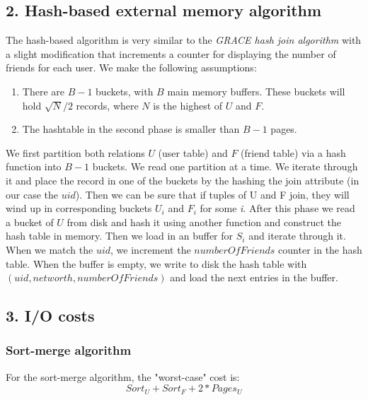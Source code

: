 \documentclass{article}      %
\begin{document}
\subsection* {2. Hash-based external memory algorithm}

The hash-based algorithm is very similar to the \emph{GRACE hash join algorithm} with a slight modification that increments a counter for displaying the number of friends for each user. We make the following assumptions:

\begin{enumerate}
\item 
There are $B-1$ buckets, with $B$ main memory buffers. These buckets will hold \begin{math}\sqrt{N}/2\end{math} records, where $N$ is the highest of $U$ and $F$. 
\item
The hashtable in the second phase is smaller than $B-1$ pages.
\end{enumerate}

We first partition both relations $U$ (user table) and $F$ (friend table) via a hash function into $B-1$ buckets. We read one partition at a time. We iterate through it and place the record in one of the buckets by the hashing the join attribute (in our case the $uid$). Then we can be sure that if tuples of U and F join, they will wind up in corresponding buckets $U_i$ and $F_i$ for some \emph{i}. After this phase we read a bucket of $U$ from disk and hash it using another function and construct the hash table in memory. Then we load in an buffer for $S_i$ and iterate through it. When we match the $uid$, we increment the $numberOfFriends$ counter in the hash table. When the buffer is empty, we write to disk the hash table with $(uid, networth, numberOfFriends)$ and load the next entries in the buffer.\\

\subsection* {3. I/O costs}

\subsubsection* {Sort-merge algorithm}

For the sort-merge algorithm, the "worst-case" cost is:
\begin{equation}
Sort_U + Sort_F + 2* Pages_U 
\end{equation}
\end{document}

